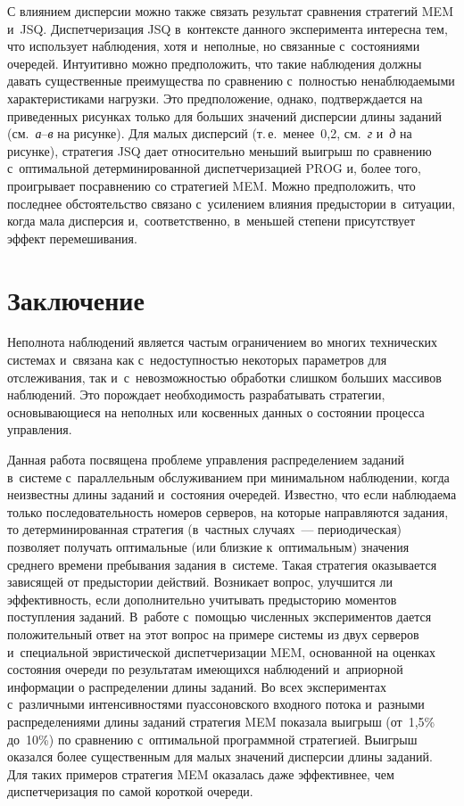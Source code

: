 \begin{multicols}{2}
    
    С влиянием дисперсии можно также связать результат сравнения стратегий MEM 
и~JSQ. Диспетчеризация JSQ в~контексте данного эксперимента интересна тем, что 
использует наблюдения, хотя и~неполные, но связанные с~состояниями очередей. 
Интуитивно можно предположить, что такие наблюдения должны давать существенные 
преимущества по сравнению с~полностью ненаблюдаемы\-ми характеристиками нагрузки. 
Это предположение, однако, подтверждается на приведенных рисунках только для 
больших значений дисперсии длины заданий (см.\
\textit{а}--\textit{в} на рисунке). Для малых 
дис\-пер\-сий (т.\,е.\ менее~0,2, см.\ \textit{г} и~\textit{д} на рисунке), 
стратегия JSQ дает 
относительно меньший выигрыш по сравнению с~оптимальной детерминированной 
диспетчеризацией PROG и, более того, проигрывает по\linebreak сравнению со стратегией MEM. 
Можно предположить, что последнее обстоятельство связано с~усилением влияния 
предыстории в~ситуации, когда мала дисперсия и,~соответственно, в~меньшей степени 
присутствует эффект перемешивания.

\section{Заключение}

    Неполнота наблюдений является частым ограничением во многих технических 
системах и~связана как с~недоступностью некоторых параметров для отслеживания, так 
и~с~невозможностью обработки слишком больших массивов наблюдений. Это порождает 
необходимость разрабатывать стратегии, основывающиеся на неполных или косвенных 
данных о состоянии процесса управления.
    
    Данная работа посвящена проблеме управления распределением заданий в~системе 
с~параллельным обслуживанием при минимальном наблюдении, когда неизвестны длины 
заданий и~состояния очередей. Известно, что если наблюдаема только последовательность 
номеров серверов, на которые направляются задания, то детерминированная стратегия 
(в~частных случаях~--- периодическая) позволяет получать оптимальные (или близкие 
к~оптимальным) значения среднего времени пребывания задания в~системе. Такая 
стратегия оказывается зависящей от предыстории действий. Возникает вопрос, улучшится 
ли эффективность, если дополнительно учитывать предысторию моментов поступления 
заданий. В~работе с~помощью численных экспериментов дается положительный ответ на 
этот вопрос на примере системы из двух серверов и~специальной эвристической 
диспетчеризации MEM, основанной на оценках состояния очереди по результатам 
имеющихся наблюдений и~априорной информации о распределении длины заданий. Во 
всех экспериментах с~различными интенсивностями пуассоновского входного потока 
и~разными распределениями длины заданий стратегия MEM показала выигрыш (от~1,5\% 
до~10\%) по сравнению с~оптимальной программной стратегией. Выигрыш оказался более 
существенным для малых значений дисперсии длины заданий. Для таких примеров 
стратегия MEM оказалась даже эффективнее, чем диспетчеризация по самой короткой 
очереди.
    

\end{multicols}
